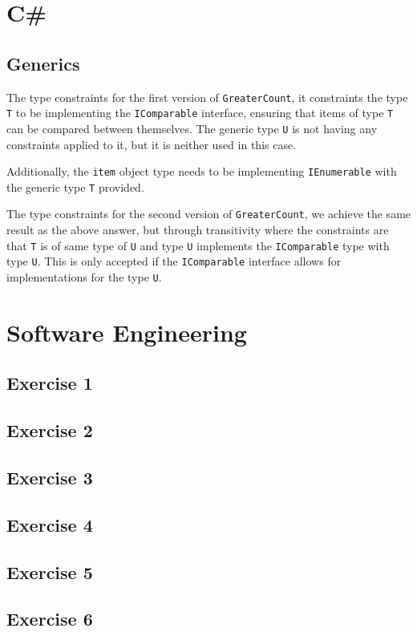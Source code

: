 \documentclass[12pt,letterpaper]{article}
\begin{document}
\section{C\#}
\subsection{Generics}
The type constraints for the first version of \lstinline{GreaterCount}, it constraints the type
\lstinline{T} to be implementing the \lstinline{IComparable} interface, ensuring that items of type \lstinline{T}
can be compared between themselves. The generic type \lstinline{U} is not having any constraints applied to it,
but it is neither used in this case. 

Additionally, the \lstinline{item} object type needs to be implementing \lstinline{IEnumerable} with the 
generic type \lstinline{T} provided.

The type constraints for the second version of \lstinline{GreaterCount}, we achieve the same result as the above answer,
but through transitivity where the constraints are that \lstinline{T} is of same type of \lstinline{U} and type \lstinline{U} 
implements the \lstinline{IComparable} type with type \lstinline{U}. This is only accepted if the \lstinline{IComparable} interface
allows for implementations for the type \lstinline{U}.

\section{Software Engineering}
\subsection{Exercise 1}


\subsection{Exercise 2}


\subsection{Exercise 3}


\subsection{Exercise 4}


\subsection{Exercise 5}


\subsection{Exercise 6}
\end{document}
